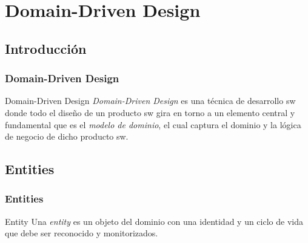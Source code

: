 \documentclass[a4paper,slidestop,xcolor=pst,dvips,blue]{beamer}
\begin{document}
\section{Domain-Driven Design}

\subsection{Introducción}

\begin{frame}[c]
    \frametitle{Domain-Driven Design}
     \begin{block}{Domain-Driven Design}
        \alert{\emph{Domain-Driven Design}} es una técnica de desarrollo sw donde todo el diseño de un producto sw gira en torno a un elemento central y fundamental que es el \emph{modelo de dominio}, el cual captura el dominio y la lógica de negocio de dicho producto sw.
     \end{block}

\end{frame}

%
\subsection{Entities}

\begin{frame}[c]
    \frametitle{Entities}
     \begin{block}{Entity}
        Una \emph{entity} es un objeto del dominio con una identidad y un ciclo de vida que debe ser reconocido y monitorizados.
     \end{block}
\end{frame}
\end{document}
